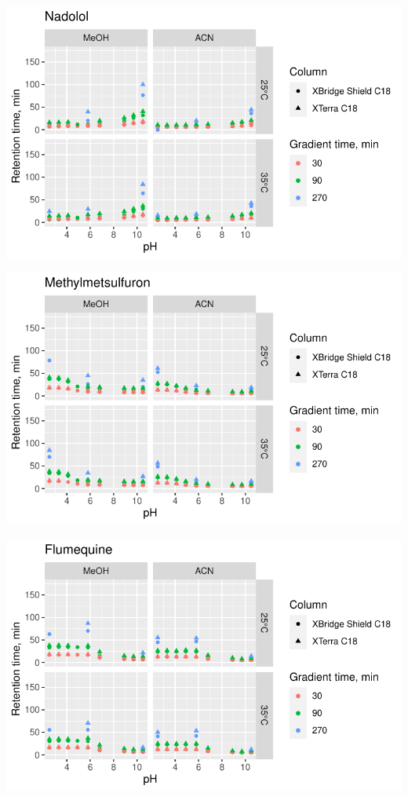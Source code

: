 \documentclass[
  letterpaper,
  DIV=11,
  numbers=noendperiod]{scrreprt}
\begin{document}
\includegraphics{index_files/figure-pdf/unnamed-chunk-4-135.pdf}

\includegraphics{index_files/figure-pdf/unnamed-chunk-4-136.pdf}

\includegraphics{index_files/figure-pdf/unnamed-chunk-4-137.pdf}
\end{document}
